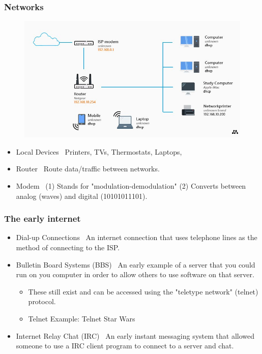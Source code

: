 \documentclass{beamer}
\begin{document}
%
%
\begin{frame}[fragile]
    \frametitle{Networks}
    \begin{minipage}{0.49\textwidth}
        \begin{figure}
            \includegraphics[width=\textwidth]{./imgs/homenetwork.jpg}
        \end{figure}
    \end{minipage}
    \begin{minipage}{0.49\textwidth}
        \begin{itemize}
                \pause
            \item Local Devices \textrightarrow \ Printers, TVs, Thermostats, Laptops, 
                \pause
            \item Router \textrightarrow \ Route data/traffic between networks.
                \pause
            \item Modem \textrightarrow \ (1) Stands for "modulation-demodulation" (2) Converts between analog (waves) and digital (10101011101).
        \end{itemize}
    \end{minipage}
\end{frame}

%
%
\begin{frame}[fragile]
    \frametitle{The early internet}
    \begin{itemize}
        \item Dial-up Connections \textrightarrow  \ An internet connection that uses telephone lines as the method of connecting to the ISP. 
            \pause
        \item Bulletin Board Systems (BBS) \textrightarrow \ An early example of a server that you could run on you computer in order to allow others to use software on that server.
            \begin{itemize}
                \item These still exist and can be accessed using the "teletype network" (telnet) protocol.
                \item Telnet Example: Telnet Star Wars 
            \end{itemize}
            \pause
        \item Internet Relay Chat (IRC) \textrightarrow \ An early instant messaging system that allowed someone to use a IRC client program to connect to a server and chat.
    \end{itemize}
\end{frame}
\end{document}
